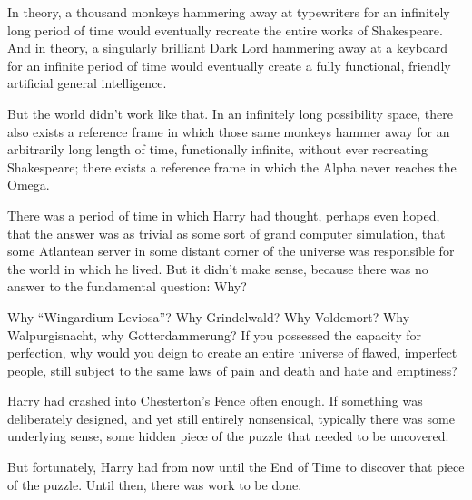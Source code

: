 In theory, a thousand monkeys hammering away at typewriters for an infinitely long period of time would eventually recreate the entire works of Shakespeare. And in theory, a singularly brilliant Dark Lord hammering away at a keyboard for an infinite period of time would eventually create a fully functional, friendly artificial general intelligence.

But the world didn’t work like that. In an infinitely long possibility space, there also exists a reference frame in which those same monkeys hammer away for an arbitrarily long length of time, functionally infinite, without ever recreating Shakespeare; there exists a reference frame in which the Alpha never reaches the Omega.

There was a period of time in which Harry had thought, perhaps even hoped, that the answer was as trivial as some sort of grand computer simulation, that some Atlantean server in some distant corner of the universe was responsible for the world in which he lived. But it didn’t make sense, because there was no answer to the fundamental question: Why?

Why “Wingardium Leviosa”? Why Grindelwald? Why Voldemort? Why Walpurgisnacht, why Gotterdammerung? If you possessed the capacity for perfection, why would you deign to create an entire universe of flawed, imperfect people, still subject to the same laws of pain and death and hate and emptiness?

Harry had crashed into Chesterton’s Fence often enough. If something was deliberately designed, and yet still entirely nonsensical, typically there was some underlying sense, some hidden piece of the puzzle that needed to be uncovered.

But fortunately, Harry had from now until the End of Time to discover that piece of the puzzle. Until then, there was work to be done.
